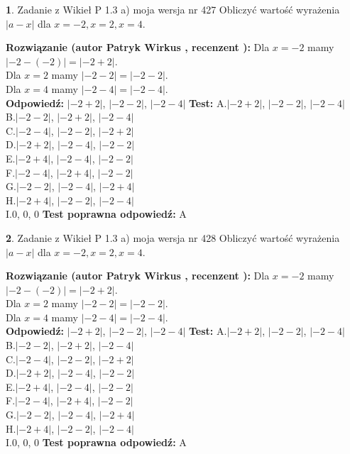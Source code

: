 \documentclass[12pt, a4paper]{article}
\theoremstyle{definition} %
\newtheorem{zad}{}
\newcommand{\zadStart}[1]{\begin{zad}#1\newline}
\newcommand{\zadStop}{\end{zad}}
\newcommand{\rozwStart}[2]{\noindent \textbf{Rozwiązanie (autor #1 , recenzent #2): }\newline}
\newcommand{\rozwStop}{\newline}
\newcommand{\odpStart}{\noindent \textbf{Odpowiedź:}\newline}
\newcommand{\odpStop}{\newline}
\newcommand{\testStart}{\noindent \textbf{Test:}\newline}
\newcommand{\testStop}{\newline}
\newcommand{\kluczStart}{\noindent \textbf{Test poprawna odpowiedź:}\newline}
\newcommand{\kluczStop}{\newline}
\begin{document}
\zadStart{Zadanie z Wikieł P 1.3 a) moja wersja nr 427}
Obliczyć wartość wyrażenia $|a - x|$ dla $x=-2,x=2,x=4$.
\zadStop
\rozwStart{Patryk Wirkus}{}
Dla $x = -2$ mamy $|-2 - (-2)| = |-2 + 2|$.\\
Dla $x = 2$ mamy $|-2 - 2| = |-2 - 2|$.\\
Dla $x = 4$ mamy $|-2 - 4| = |-2 - 4|$.\\
\rozwStop
\odpStart
$|-2 + 2|$, $|-2 - 2|$, $|-2 - 4|$
\odpStop
\testStart
A.$|-2 + 2|$, $|-2 - 2|$, $|-2 - 4|$\\
B.$|-2 - 2|$, $|-2 + 2|$, $|-2 - 4|$\\
C.$|-2 - 4|$, $|-2 - 2|$, $|-2 + 2|$\\
D.$|-2 + 2|$, $|-2 - 4|$, $|-2 - 2|$\\
E.$|-2 + 4|$, $|-2 - 4|$, $|-2 - 2|$\\
F.$|-2 - 4|$, $|-2 + 4|$, $|-2 - 2|$\\
G.$|-2 - 2|$, $|-2 - 4|$, $|-2 + 4|$\\
H.$|-2 + 4|$, $|-2 - 2|$, $|-2 - 4|$\\
I.$0$, $0$, $0$
\testStop
\kluczStart
A
\kluczStop



\zadStart{Zadanie z Wikieł P 1.3 a) moja wersja nr 428}
Obliczyć wartość wyrażenia $|a - x|$ dla $x=-2,x=2,x=4$.
\zadStop
\rozwStart{Patryk Wirkus}{}
Dla $x = -2$ mamy $|-2 - (-2)| = |-2 + 2|$.\\
Dla $x = 2$ mamy $|-2 - 2| = |-2 - 2|$.\\
Dla $x = 4$ mamy $|-2 - 4| = |-2 - 4|$.\\
\rozwStop
\odpStart
$|-2 + 2|$, $|-2 - 2|$, $|-2 - 4|$
\odpStop
\testStart
A.$|-2 + 2|$, $|-2 - 2|$, $|-2 - 4|$\\
B.$|-2 - 2|$, $|-2 + 2|$, $|-2 - 4|$\\
C.$|-2 - 4|$, $|-2 - 2|$, $|-2 + 2|$\\
D.$|-2 + 2|$, $|-2 - 4|$, $|-2 - 2|$\\
E.$|-2 + 4|$, $|-2 - 4|$, $|-2 - 2|$\\
F.$|-2 - 4|$, $|-2 + 4|$, $|-2 - 2|$\\
G.$|-2 - 2|$, $|-2 - 4|$, $|-2 + 4|$\\
H.$|-2 + 4|$, $|-2 - 2|$, $|-2 - 4|$\\
I.$0$, $0$, $0$
\testStop
\kluczStart
A
\kluczStop
\end{document}
